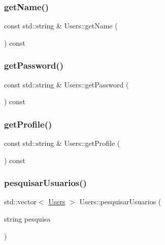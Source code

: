 \mbox{\label{class_users_a51fc6ec262ea9e53744702a983349388}} 
\subsubsection{\texorpdfstring{get\+Name()}{getName()}}
{\footnotesize\ttfamily const std\+::string \& Users\+::get\+Name (\begin{DoxyParamCaption}{ }\end{DoxyParamCaption}) const}

\mbox{\label{class_users_af207ce1e4f918448b633b4456e3c8a75}} 
\subsubsection{\texorpdfstring{get\+Password()}{getPassword()}}
{\footnotesize\ttfamily const std\+::string \& Users\+::get\+Password (\begin{DoxyParamCaption}{ }\end{DoxyParamCaption}) const}

\mbox{\label{class_users_adcb2ccba1daff8a93097f33386c31785}} 
\subsubsection{\texorpdfstring{get\+Profile()}{getProfile()}}
{\footnotesize\ttfamily const std\+::string \& Users\+::get\+Profile (\begin{DoxyParamCaption}{ }\end{DoxyParamCaption}) const}

\mbox{\label{class_users_a8c59b2c1356db94c2d6ea891c922416f}} 
\subsubsection{\texorpdfstring{pesquisar\+Usuarios()}{pesquisarUsuarios()}}
{\footnotesize\ttfamily std\+::vector$<$ \hyperlink{class_users}{Users} $>$ Users\+::pesquisar\+Usuarios (\begin{DoxyParamCaption}\item[{string}]{pesquisa }\end{DoxyParamCaption})}

